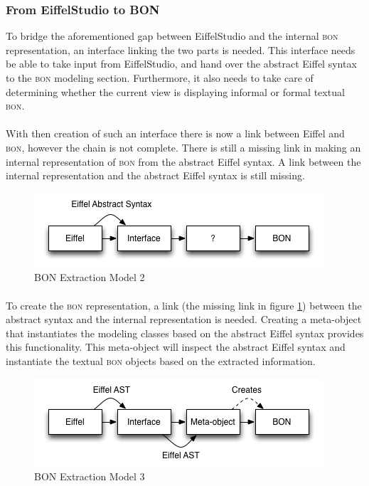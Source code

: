 \subsubsection{From EiffelStudio to BON}
To bridge the aforementioned gap between EiffelStudio and the internal \textsc{bon} representation, an interface linking the two parts is needed. This interface needs be able to take input from EiffelStudio, and hand over the abstract Eiffel syntax to the \textsc{bon} modeling section. Furthermore, it also needs to take care of determining whether the current view is displaying informal or formal textual \textsc{bon}.

\paragraph{}
With then creation of such an interface there is now a link between Eiffel and \textsc{bon}, however the chain is not complete. There is still a missing link in making an internal representation of \textsc{bon} from the abstract Eiffel syntax. A link between the internal representation and the abstract Eiffel syntax is still missing.
\begin{figure}[H]
\centering
\includegraphics[scale=0.8]{images/BON-extraction-model-2.png}
\caption{BON Extraction Model 2}
\label{fig:bon_extraction_2}
\end{figure}

\paragraph{}
To create the \textsc{bon} representation, a link (the missing link in figure \ref{fig:bon_extraction_2}) between the abstract syntax and the internal representation is needed. Creating a meta-object that instantiates the modeling classes based on the abstract Eiffel syntax provides this functionality. This meta-object will inspect the abstract Eiffel syntax and instantiate the textual \textsc{bon} objects based on the extracted information.
\begin{figure}[H]
\centering
\includegraphics[scale=0.8]{images/BON-extraction-model-3.png}
\caption{BON Extraction Model 3}
\label{fig:bon_extraction_3}
\end{figure}


